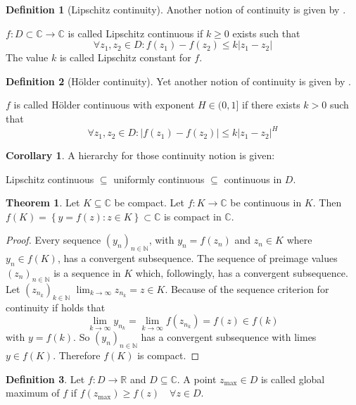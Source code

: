 \documentclass[a4paper,landscape,twocolumn]{article}
\theoremstyle{definition}
\newtheorem{theorem}{Theorem}
\newtheorem{defi}{Definition}
\newtheorem{cor}{Corollary}
\newcommand\set[1]{\left\{#1\right\}}
\newcommand\abs[1]{\left|#1\right|}
\begin{document}
%
\begin{defi}[Lipschitz continuity]
  Another notion of continuity is given by .

  $f: D \subset \mathbb C \rightarrow \mathbb C$ is called Lipschitz continuous
  if $k \geq 0$ exists such that
  \[
    \forall z_1, z_2 \in D:
    f(z_1) - f(z_2) \leq k \abs{z_1 - z_2}
  \]
  The value $k$ is called Lipschitz constant for $f$.
\end{defi}
%
\begin{defi}[Hölder continuity]
  Yet another notion of continuity is given by .

  $f$ is called Hölder continuous with exponent $H \in (0, 1]$ if there exists
  $k > 0$ such that
  \[ \forall z_1, z_2 \in D: \abs{f(z_1) - f(z_2)} \leq k \abs{z_1 - z_2}^H \]
\end{defi}
%
\begin{cor}
  A hierarchy for those continuity notion is given:

  Lipschitz continuous $\subseteq$ uniformly continuous $\subseteq$ continuous in $D$.
\end{cor}
%
\begin{theorem}
  Let $K \subseteq \mathbb C$ be compact. Let $f: K \rightarrow \mathbb C$ be continuous
  in $K$. Then $f(K) = \set{y = f(z): z \in K} \subset \mathbb C$ is compact in $\mathbb C$.
\end{theorem}
\begin{proof}
  Every sequence $(y_n)_{n \in \mathbb N}$,
  with $y_n = f(z_n)$ and $z_n \in K$ where $y_n \in f(K)$,
  has a convergent subsequence. The sequence of preimage values $(z_n)_{n \in \mathbb N}$
  is a sequence in $K$ which, followingly, has a convergent subsequence.
  Let $(z_{n_k})_{k \in \mathbb N}$
  $\lim_{k \to \infty} z_{n_k} = z \in K$.
  Because of the sequence criterion for continuity if holds that
  \[ \lim_{k \to \infty} y_{n_k} = \lim_{k \to \infty} f(z_{n_k}) = f(z) \in f(k) \]
  with $y = f(k)$.
  So $(y_n)_{n \in \mathbb N}$ has a convergent subsequence with limes $y \in f(K)$.
  Therefore $f(K)$ is compact.
\end{proof}
%
\begin{defi}
  Let $f: D \rightarrow \mathbb R$ and $D \subseteq \mathbb C$. A point $z_{\text{max}} \in D$
  is called global maximum of $f$ if $f(z_{\text{max}}) \geq f(z) \quad\forall z \in D$.
\end{defi}
\end{document}
